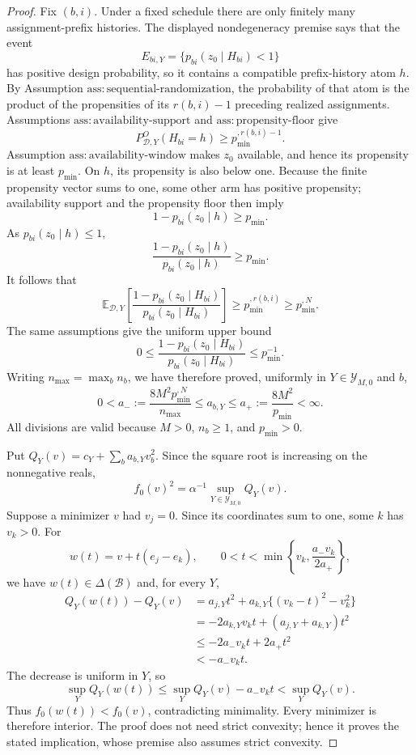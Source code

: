 \documentclass{article}
\begin{document}
\begin{proof}
Fix \((b,i)\).  Under a fixed schedule there are only finitely many assignment-prefix histories.  The displayed nondegeneracy premise says that the event
\[
 E_{bi,Y}=\{p_{bi}(z_0\mid H_{bi})<1\}
\]
has positive design probability, so it contains a compatible prefix-history atom \(h\).  By Assumption \(\mathrm{ass:sequential\text{-}randomization}\), the probability of that atom is the product of the propensities of its \(r(b,i)-1\) preceding realized assignments.  Assumptions \(\mathrm{ass:availability\text{-}support}\) and \(\mathrm{ass:propensity\text{-}floor}\) give
\[
 P^O_{\mathcal D,Y}(H_{bi}=h)\ge p_{\min}^{,r(b,i)-1}.
\]
Assumption \(\mathrm{ass:availability\text{-}window}\) makes \(z_0\) available, and hence its propensity is at least \(p_{\min}\).  On \(h\), its propensity is also below one.  Because the finite propensity vector sums to one, some other arm has positive propensity; availability support and the propensity floor then imply
\[
 1-p_{bi}(z_0\mid h)\ge p_{\min}.
\]
As \(p_{bi}(z_0\mid h)\le1\),
\[
 \frac{1-p_{bi}(z_0\mid h)}{p_{bi}(z_0\mid h)}\ge p_{\min}.
\]
It follows that
\[
 \mathbb E_{\mathcal D,Y}\!\left[
 \frac{1-p_{bi}(z_0\mid H_{bi})}{p_{bi}(z_0\mid H_{bi})}
 \right]
 \ge p_{\min}^{,r(b,i)}\ge p_{\min}^{,N}.
\]
The same assumptions give the uniform upper bound
\[
 0\le
 \frac{1-p_{bi}(z_0\mid H_{bi})}{p_{bi}(z_0\mid H_{bi})}
 \le p_{\min}^{-1}.
\]
Writing \(n_{\max}=\max_b n_b\), we have therefore proved, uniformly in \(Y\in\mathcal Y_{M,0}\) and \(b\),
\[
 0<a_-:=\frac{8M^2p_{\min}^{,N}}{n_{\max}}
 \le a_{b,Y}
 \le a_+:=\frac{8M^2}{p_{\min}}<\infty.
\]
All divisions are valid because \(M>0\), \(n_b\ge1\), and \(p_{\min}>0\).

Put \(Q_Y(v)=c_Y+\sum_ba_{b,Y}v_b^2\).  Since the square root is increasing on the nonnegative reals,
\[
 f_0(v)^2=\alpha^{-1}\sup_{Y\in\mathcal Y_{M,0}}Q_Y(v).
\]
Suppose a minimizer \(v\) had \(v_j=0\).  Since its coordinates sum to one, some \(k\) has \(v_k>0\).  For
\[
 w(t)=v+t(e_j-e_k),
 \qquad
 0<t<\min\!\left\{v_k,\frac{a_-v_k}{2a_+}\right\},
\]
we have \(w(t)\in\Delta(\mathcal B)\) and, for every \(Y\),
\[
 \begin{aligned}
 Q_Y(w(t))-Q_Y(v)
 &=a_{j,Y}t^2+a_{k,Y}\{(v_k-t)^2-v_k^2\}\\
 &=-2a_{k,Y}v_kt+(a_{j,Y}+a_{k,Y})t^2\\
 &\le-2a_-v_kt+2a_+t^2\\
 &<-a_-v_kt.
 \end{aligned}
\]
The decrease is uniform in \(Y\), so
\[
 \sup_YQ_Y(w(t))
 \le\sup_YQ_Y(v)-a_-v_kt
 <\sup_YQ_Y(v).
\]
Thus \(f_0(w(t))<f_0(v)\), contradicting minimality.  Every minimizer is therefore interior.  The proof does not need strict convexity; hence it proves the stated implication, whose premise also assumes strict convexity.


\end{proof}
\end{document}
